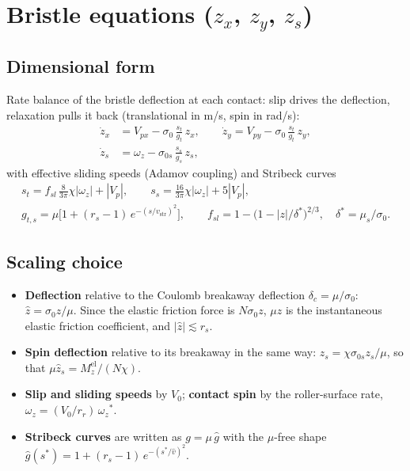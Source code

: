 \documentclass[11pt]{article}
\newcommand{\st}[1]{{#1}^{*}}
\begin{document}
\section{Bristle equations ($z_x$, $z_y$, $z_s$)}

\subsection{Dimensional form}
Rate balance of the bristle deflection at each contact: slip drives the
deflection, relaxation pulls it back (translational in m/s, spin in rad/s):
\begin{align}
\dot z_{x} &= V_{px} - \sigma_0\,\frac{s_t}{g_t}\,z_{x}, \qquad
\dot z_{y} = V_{py} - \sigma_0\,\frac{s_t}{g_t}\,z_{y}, \label{eq:bristle}\\
\dot z_{s} &= \omega_{z} - \sigma_{0s}\,\frac{s_s}{g_s}\,z_{s}, \label{eq:bristles}
\end{align}
with effective sliding speeds (Adamov coupling) and Stribeck curves
\begin{gather*}
s_t = f_{sl}\,\tfrac{8}{3\pi}\chi|\omega_z| + |V_p|, \qquad
s_s = \tfrac{16}{3\pi}\chi|\omega_z| + 5|V_p|,\\
g_{t,s} = \mu\big[1 + (r_s - 1)\,e^{-(s/v_{\mathrm{str}})^2}\big], \qquad
f_{sl} = 1 - \big(1 - |z|/\delta^*\big)^{2/3},\quad \delta^* = \mu_s/\sigma_0 .
\end{gather*}

\subsection{Scaling choice}
\begin{itemize}
  \item \textbf{Deflection} relative to the Coulomb breakaway deflection
    $\delta_c = \mu/\sigma_0$:
    $\hat z = \sigma_0 z/\mu$. Since the elastic friction force is
    $N\sigma_0 z$, $\mu\hat z$ is the instantaneous elastic friction
    coefficient, and $|\hat z| \lesssim r_s$.
  \item \textbf{Spin deflection} relative to its breakaway in the same way:
    $\hat z_s = \chi\sigma_{0s} z_s/\mu$, so that $\mu\hat z_s = M_z^{\mathrm{el}}/(N\chi)$.
  \item \textbf{Slip and sliding speeds} by $V_0$; \textbf{contact spin} by the
    roller-surface rate, $\omega_z = (V_0/r_r)\,\st{\omega_z}$.
  \item \textbf{Stribeck curves} are written as $g = \mu\,\hat g$ with the
    $\mu$-free shape $\hat g(\st s) = 1 + (r_s-1)\,e^{-(\st s/\hat v)^2}$.
\end{itemize}
\end{document}
